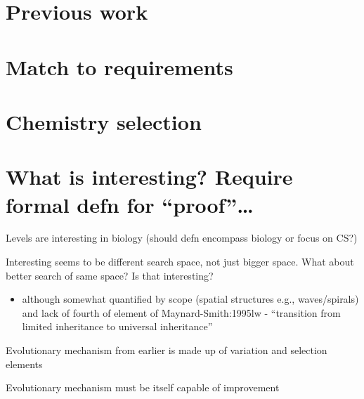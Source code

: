 \section{Previous work}\label{previous-work-1}

\section{Match to requirements}\label{match-to-requirements}

\section{Chemistry selection}\label{chemistry-selection}

{\autocite{Soros2014}}

\section{\texorpdfstring{What is interesting? Require formal defn for ``proof''\ldots{}}{What is interesting? Require formal defn for proof\ldots{}}}\label{what-is-interesting-require-formal-defn-for-proof}

Levels are interesting in biology (should defn encompass biology or
focus on CS?)

Interesting seems to be different search space, not just bigger space.
What about better search of same space? Is that interesting?

{\autocite{Hogeweg1998}}

\begin{itemize}
	\item
 although somewhat quantified by scope (spatial structures e.g.,
 waves/spirals) and lack of fourth of element of Maynard-Smith:1995lw -
 ``transition from limited inheritance to universal inheritance''
\end{itemize}

Evolutionary mechanism from earlier is made up of variation and
selection elements

Evolutionary mechanism must be itself capable of improvement

